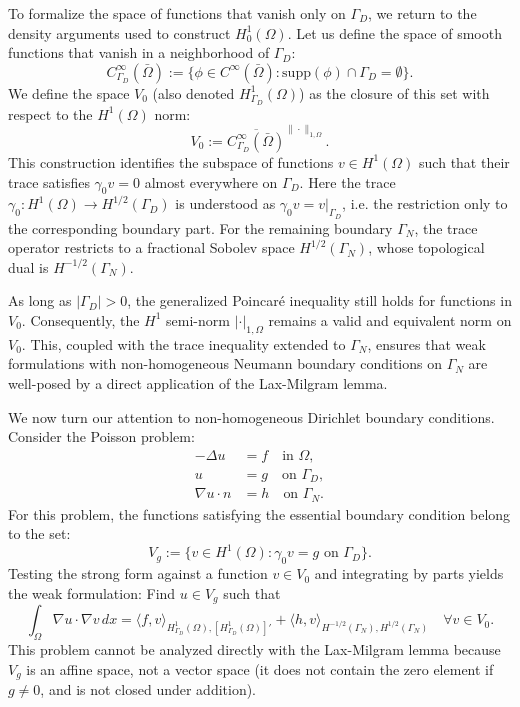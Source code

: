 To formalize the space of functions that vanish only on $\Gamma_D$, we return to the density arguments used to construct $H^1_0(\Omega)$. Let us define the space of smooth functions that vanish in a neighborhood of $\Gamma_D$:
$$ C^\infty_{\Gamma_D}(\bar{\Omega}) := \{ \phi \in C^\infty(\bar{\Omega}) : \text{supp}(\phi) \cap \Gamma_D = \emptyset \}. $$
We define the space $V_0$ (also denoted $H^1_{\Gamma_D}(\Omega)$) as the closure of this set with respect to the $H^1(\Omega)$ norm:
$$ V_0 := \overline{C^\infty_{\Gamma_D}(\bar{\Omega})}^{\|\cdot\|_{1,\Omega}}. $$
This construction identifies the subspace of functions $v \in H^1(\Omega)$ such that their trace satisfies $\gamma_0 v = 0$ almost everywhere on $\Gamma_D$. Here the trace $\gamma_0: H^1(\Omega) \to H^{1/2}(\Gamma_D)$ is understood as $\gamma_0 v = v|_{\Gamma_D}$, i.e. the restriction only to the corresponding boundary part. For the remaining boundary $\Gamma_N$, the trace operator restricts to a fractional Sobolev space $H^{1/2}(\Gamma_N)$, whose topological dual is $H^{-1/2}(\Gamma_N)$.

\begin{remark}
As long as $|\Gamma_D| > 0$, the generalized Poincar\'e inequality still holds for functions in $V_0$. Consequently, the $H^1$ semi-norm $|\cdot|_{1,\Omega}$ remains a valid and equivalent norm on $V_0$. This, coupled with the trace inequality extended to $\Gamma_N$, ensures that weak formulations with non-homogeneous Neumann boundary conditions on $\Gamma_N$ are well-posed by a direct application of the Lax-Milgram lemma.
\end{remark}

We now turn our attention to non-homogeneous Dirichlet boundary conditions. Consider the Poisson problem:
\begin{align*}
    -\Delta u &= f \quad \text{in } \Omega, \\
    u &= g \quad \text{on } \Gamma_D, \\
    \nabla u \cdot n &= h \quad \text{on } \Gamma_N.
\end{align*}
For this problem, the functions satisfying the essential boundary condition belong to the set:
$$ V_g := \{ v \in H^1(\Omega) : \gamma_0 v = g \text{ on } \Gamma_D \}. $$
Testing the strong form against a function $v \in V_0$ and integrating by parts yields the weak formulation: Find $u \in V_g$ such that
$$ \int_\Omega \nabla u \cdot \nabla v \, dx = \langle f,  v \rangle_{H^1_{\Gamma_D}(\Omega), [H^1_{\Gamma_D}(\Omega)]'} + \langle h,  v \rangle_{H^{-1/2}(\Gamma_N), H^{1/2}(\Gamma_N)} \quad \forall v \in V_0. $$
This problem cannot be analyzed directly with the Lax-Milgram lemma because $V_g$ is an affine space, not a vector space (it does not contain the zero element if $g \neq 0$, and is not closed under addition).

